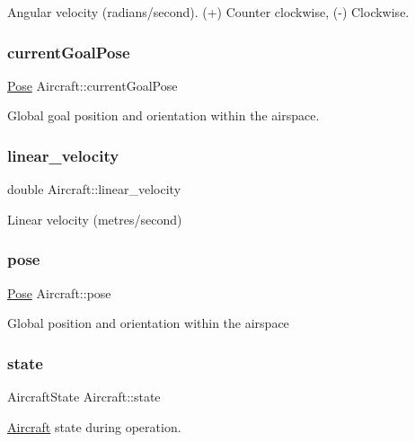 Angular velocity (radians/second). (+) Counter clockwise, (-\/) Clockwise. \mbox{\label{structAircraft_a350988ee89dd6631da4e991844a98975}} 
\subsubsection{\texorpdfstring{current\+Goal\+Pose}{currentGoalPose}}
{\footnotesize\ttfamily \hyperlink{structPose}{Pose} Aircraft\+::current\+Goal\+Pose}

Global goal position and orientation within the airspace. \mbox{\label{structAircraft_a892016ca5094e6c5bf0fb79c94310e76}} 
\subsubsection{\texorpdfstring{linear\+\_\+velocity}{linear\_velocity}}
{\footnotesize\ttfamily double Aircraft\+::linear\+\_\+velocity}

Linear velocity (metres/second) \mbox{\label{structAircraft_ae974de419f4b2570b0d4416e5e5aeac3}} 
\subsubsection{\texorpdfstring{pose}{pose}}
{\footnotesize\ttfamily \hyperlink{structPose}{Pose} Aircraft\+::pose}

Global position and orientation within the airspace \mbox{\label{structAircraft_a2dbb23441b3d3565f223de5658eb868f}} 
\subsubsection{\texorpdfstring{state}{state}}
{\footnotesize\ttfamily Aircraft\+State Aircraft\+::state}

\hyperlink{structAircraft}{Aircraft} state during operation. \mbox{\label{structAircraft_a256a704e2dbf859d95d4eb28b0e02aa3}} 

